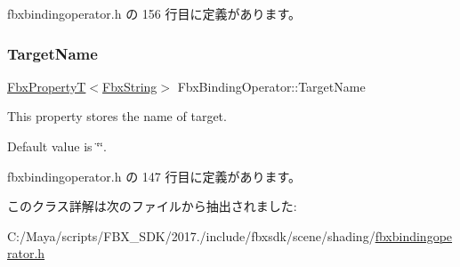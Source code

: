  fbxbindingoperator.\+h の 156 行目に定義があります。

\mbox{\label{class_fbx_binding_operator_a6c1e84a9019ff0fa80424439fa745ee1}} 
\subsubsection{\texorpdfstring{Target\+Name}{TargetName}}
{\footnotesize\ttfamily \hyperlink{class_fbx_property_t}{Fbx\+PropertyT}$<$\hyperlink{class_fbx_string}{Fbx\+String}$>$ Fbx\+Binding\+Operator\+::\+Target\+Name}

This property stores the name of target.

Default value is \char`\"{}\char`\"{}. 

 fbxbindingoperator.\+h の 147 行目に定義があります。



このクラス詳解は次のファイルから抽出されました\+:\begin{DoxyCompactItemize}
\item 
C\+:/\+Maya/scripts/\+F\+B\+X\+\_\+\+S\+D\+K/2017./include/fbxsdk/scene/shading/\hyperlink{fbxbindingoperator_8h}{fbxbindingoperator.\+h}\end{DoxyCompactItemize}
